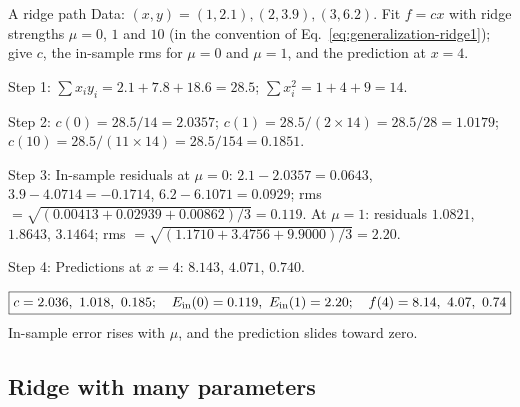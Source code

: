 \begin{sample}{A ridge path}
Data: $(x,y)=(1,2.1),(2,3.9),(3,6.2)$. Fit $f=cx$ with ridge strengths $\mu=0$, $1$ and $10$ (in the convention of Eq.~\eqref{eq:generalization-ridge1}); give $c$, the in-sample rms for $\mu=0$ and $\mu=1$, and the prediction at $x=4$.

Step 1: $\sum x_iy_i=2.1+7.8+18.6=28.5$; $\sum x_i^2=1+4+9=14$.

Step 2: $c(0)=28.5/14=2.0357$; $c(1)=28.5/(2\times14)=28.5/28=1.0179$; $c(10)=28.5/(11\times14)=28.5/154=0.1851$.

Step 3: In-sample residuals at $\mu=0$: $2.1-2.0357=0.0643$, $3.9-4.0714=-0.1714$, $6.2-6.1071=0.0929$; rms $=\sqrt{(0.00413+0.02939+0.00862)/3}=0.119$. At $\mu=1$: residuals $1.0821$, $1.8643$, $3.1464$; rms $=\sqrt{(1.1710+3.4756+9.9000)/3}=2.20$.

Step 4: Predictions at $x=4$: $8.143$, $4.071$, $0.740$.

\[
\boxed{c=2.036,\ 1.018,\ 0.185;\quad E_{\rm in}(0)=0.119,\ E_{\rm in}(1)=2.20;\quad f(4)=8.14,\ 4.07,\ 0.74}
\]
In-sample error rises with $\mu$, and the prediction slides toward zero.
\end{sample}

\subsection{Ridge with many parameters}

